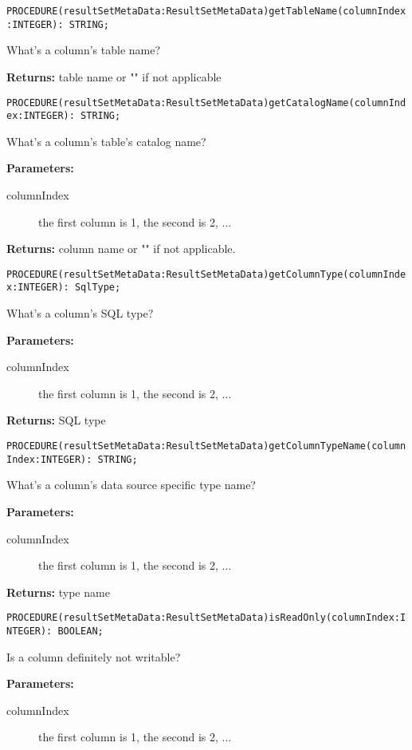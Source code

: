 
\verb'PROCEDURE(resultSetMetaData:ResultSetMetaData)getTableName(columnIndex:INTEGER): STRING;'

What's a column's table name? 


{\bf Returns: } 
table name or "" if not applicable 



\verb'PROCEDURE(resultSetMetaData:ResultSetMetaData)getCatalogName(columnIndex:INTEGER): STRING;'

What's a column's table's catalog name? 

{\bf Parameters: }
\begin{description}
\item[columnIndex] the first column is 1, the second is 2, ... 
\end{description}

{\bf Returns: } 
column name or "" if not applicable. 



\verb'PROCEDURE(resultSetMetaData:ResultSetMetaData)getColumnType(columnIndex:INTEGER): SqlType;'

What's a column's SQL type? 

{\bf Parameters: }
\begin{description}
\item[columnIndex] the first column is 1, the second is 2, ... 
\end{description}

{\bf Returns: } 
SQL type 



\verb'PROCEDURE(resultSetMetaData:ResultSetMetaData)getColumnTypeName(columnIndex:INTEGER): STRING;'

What's a column's data source specific type name? 

{\bf Parameters: }
\begin{description}
\item[columnIndex] the first column is 1, the second is 2, ... 
\end{description}

{\bf Returns: } 
type name 



\verb'PROCEDURE(resultSetMetaData:ResultSetMetaData)isReadOnly(columnIndex:INTEGER): BOOLEAN;'

Is a column definitely not writable? 

{\bf Parameters: }
\begin{description}
\item[columnIndex] the first column is 1, the second is 2, ... 
\end{description}

